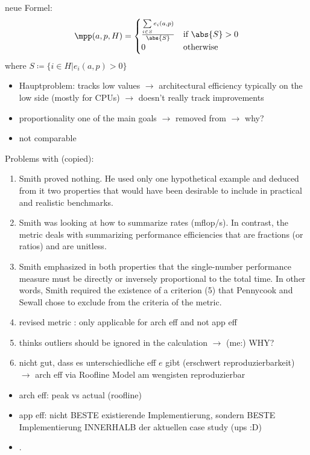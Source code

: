 neue Formel:
\[ \mpp(a, p, H) = 
        \begin{cases}
            \frac{\sum\limits_{i \in S} e_i(a, p)}{\abs{S}} & \text{if }\abs{S} > 0 \\
            0                         & \text{otherwise}
        \end{cases} 
\]
where $S \coloneqq \{ i \in H | e_i(a, p) > 0 \}$

\begin{itemize}
    \item \pp Hauptproblem: tracks low values $\rightarrow$ architectural efficiency typically on the low side (mostly for CPUs) $\rightarrow$ \pp doesn't really track improvements
    \item proportionality one of the main goals $\rightarrow$ removed from \pp $\rightarrow$ why?
    \item not comparable
    
\end{itemize}

Problems with \cite{smith_characterizing_1988} (copied):
\begin{enumerate}
    \item Smith proved nothing. He used only one hypothetical example and deduced from it two properties that would have been desirable to include in practical and realistic benchmarks.
    \item Smith was looking at how to summarize rates (mflop/s). In contrast, the \pp metric deals with summarizing performance efficiencies that are fractions (or ratios) and are unitless.
    \item Smith emphasized in both properties that the single-number performance measure must be directly or inversely proportional to the total time.  In other words, Smith required the existence of a criterion (5) that Pennycook and Sewall chose to exclude from the criteria of the \pp metric.
    \item revised metric \pp: only applicable for arch eff and not app eff
    \item thinks outliers should be ignored in the \mpp calculation $\rightarrow$ (me:) WHY?
    \item nicht gut, dass es unterschiedliche eff $e$ gibt (erschwert reproduzierbarkeit) $\rightarrow$ arch eff via Roofline Model am wengisten reproduzierbar
\end{enumerate}


\newpage
\cite{marowka_portability_2024}

\begin{itemize}
    \item arch eff: peak vs actual (roofline)
    \item app eff: nicht BESTE existierende Implementierung, sondern BESTE Implementierung INNERHALB der aktuellen case study (ups :D)
    \item .
\end{itemize}

